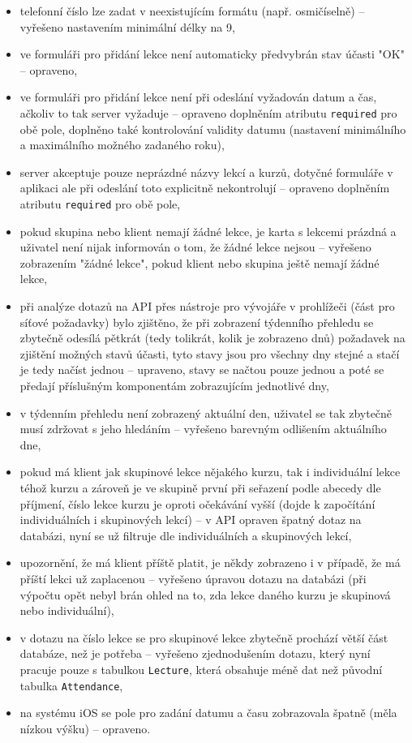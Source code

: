         \begin{itemize}
            \item telefonní číslo lze zadat v neexistujícím formátu (např. osmičíselně) -- vyřešeno nastavením minimální délky na 9,
            \item ve formuláři pro přidání lekce není automaticky předvybrán stav účasti "OK" -- opraveno,
            \item ve formuláři pro přidání lekce není při odeslání vyžadován datum a čas, ačkoliv to tak server vyžaduje -- opraveno doplněním atributu \verb|required| pro obě pole, doplněno také kontrolování validity datumu (nastavení minimálního a maximálního možného zadaného roku),
            \item server akceptuje pouze neprázdné názvy lekcí a kurzů, dotyčné formuláře v aplikaci ale při odeslání toto explicitně nekontrolují -- opraveno doplněním atributu \verb|required| pro obě pole,
            \item pokud skupina nebo klient nemají žádné lekce, je karta s lekcemi prázdná a uživatel není nijak informován o tom, že žádné lekce nejsou -- vyřešeno zobrazením "žádné lekce", pokud klient nebo skupina ještě nemají žádné lekce,
            \item při analýze dotazů na API přes nástroje pro vývojáře v prohlížeči (část pro síťové požadavky) bylo zjištěno, že při zobrazení týdenního přehledu se zbytečně odesílá pětkrát (tedy tolikrát, kolik je zobrazeno dnů) požadavek na zjištění možných stavů účasti, tyto stavy jsou pro všechny dny stejné a stačí je tedy načíst jednou -- upraveno, stavy se načtou pouze jednou a poté se předají příslušným komponentám zobrazujícím jednotlivé dny,
            \item v týdenním přehledu není zobrazený aktuální den, uživatel se tak zbytečně musí zdržovat s jeho hledáním -- vyřešeno barevným odlišením aktuálního dne,
            \item pokud má klient jak skupinové lekce nějakého kurzu, tak i individuální lekce téhož kurzu a zároveň je ve skupině první při seřazení podle abecedy dle příjmení, číslo lekce kurzu je oproti očekávání vyšší (dojde k započítání individuálních i skupinových lekcí) -- v API opraven špatný dotaz na databázi, nyní se už filtruje dle individuálních a skupinových lekcí,
            \item upozornění, že má klient příště platit, je někdy zobrazeno i v případě, že má příští lekci už zaplacenou -- vyřešeno úpravou dotazu na databázi (při výpočtu opět nebyl brán ohled na to, zda lekce daného kurzu je skupinová nebo individuální),
            \item v dotazu na číslo lekce se pro skupinové lekce zbytečně prochází větší část databáze, než je potřeba -- vyřešeno zjednodušením dotazu, který nyní pracuje pouze s tabulkou \verb|Lecture|, která obsahuje méně dat než původní tabulka \verb|Attendance|,
            \item na systému iOS se pole pro zadání datumu a času zobrazovala špatně (měla nízkou výšku) -- opraveno.
        \end{itemize}
    
